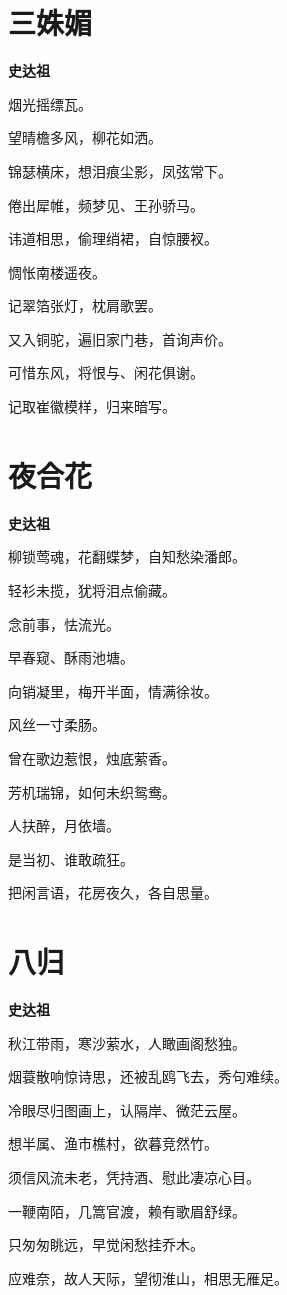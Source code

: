 \documentclass[12pt,a4paper]{ctexbook}
\begin{document}
\section{三姝媚}
\textbf{史达祖}\par\vspace{0.5em}
烟光摇缥瓦。\par
望晴檐多风，柳花如洒。\par
锦瑟横床，想泪痕尘影，凤弦常下。\par
倦出犀帷，频梦见、王孙骄马。\par
讳道相思，偷理绡裙，自惊腰衩。\par
惆怅南楼遥夜。\par
记翠箔张灯，枕肩歌罢。\par
又入铜驼，遍旧家门巷，首询声价。\par
可惜东风，将恨与、闲花俱谢。\par
记取崔徽模样，归来暗写。\par

\section{夜合花}
\textbf{史达祖}\par\vspace{0.5em}
柳锁莺魂，花翻蝶梦，自知愁染潘郎。\par
轻衫未揽，犹将泪点偷藏。\par
念前事，怯流光。\par
早春窥、酥雨池塘。\par
向销凝里，梅开半面，情满徐妆。\par
风丝一寸柔肠。\par
曾在歌边惹恨，烛底萦香。\par
芳机瑞锦，如何未织鸳鸯。\par
人扶醉，月依墙。\par
是当初、谁敢疏狂。\par
把闲言语，花房夜久，各自思量。\par

\section{八归}
\textbf{史达祖}\par\vspace{0.5em}
秋江带雨，寒沙萦水，人瞰画阁愁独。\par
烟蓑散响惊诗思，还被乱鸥飞去，秀句难续。\par
冷眼尽归图画上，认隔岸、微茫云屋。\par
想半属、渔市樵村，欲暮竞然竹。\par
须信风流未老，凭持酒、慰此凄凉心目。\par
一鞭南陌，几篙官渡，赖有歌眉舒绿。\par
只匆匆眺远，早觉闲愁挂乔木。\par
应难奈，故人天际，望彻淮山，相思无雁足。\par
\end{document}
